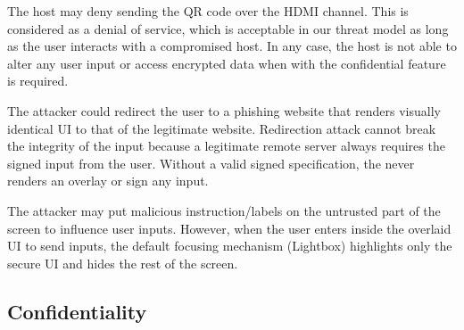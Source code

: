  The host may deny sending the QR code over the HDMI channel. This is considered as a denial of service, which is acceptable in our threat model as long as the user interacts with a compromised host. 
In any case, the host is not able to alter any user input or access encrypted data when \name with the confidential feature is required.

 The attacker could redirect the user to a phishing website that renders visually identical UI to that of the legitimate website. Redirection attack cannot break the integrity of the input because a legitimate remote server always requires the signed input from the user. Without a valid signed specification, the \device never renders an overlay or sign any input. 

 The attacker may put malicious instruction/labels on the untrusted part of the screen to influence user inputs. However, when the user enters inside the overlaid UI to send inputs, the default focusing mechanism (Lightbox) highlights only the secure UI and hides the rest of the screen. 




\subsection{Confidentiality}

